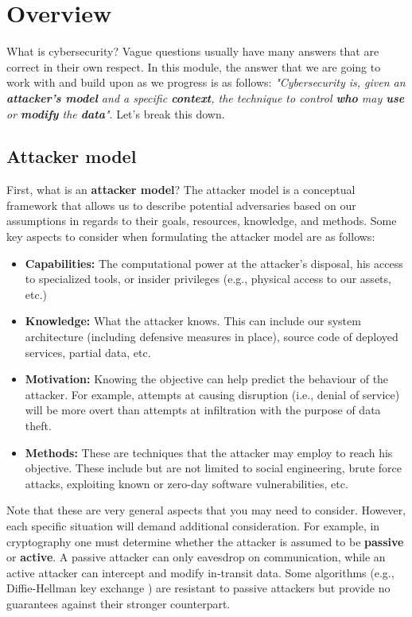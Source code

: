 \section{Overview}

What is cybersecurity? Vague questions usually have many answers that are
correct in their own respect. In this module, the answer that we are going to
work with and build upon as we progress is as follows: \textit{"Cybersecurity
is, given an \textbf{attacker's model} and a specific \textbf{context}, the
technique to control \textbf{who} may \textbf{use} or \textbf{modify} the
\textbf{data}"}. Let's break this down.

\subsection{Attacker model}

First, what is an \textbf{attacker model}? The attacker model is a conceptual
framework that allows us to describe potential adversaries based on our
assumptions in regards to their goals, resources, knowledge, and methods. Some
key aspects to consider when formulating the attacker model are as follows:

\begin{itemize}
    \item \textbf{Capabilities:} The computational power at the attacker's
          disposal, his access to specialized tools, or insider privileges
          (e.g., physical access to our assets, etc.)
    \item \textbf{Knowledge:} What the attacker knows. This can include our
          system architecture (including defensive measures in place), source
          code of deployed services, partial data, etc.
    \item \textbf{Motivation:} Knowing the objective can help predict the
          behaviour of the attacker. For example, attempts at causing disruption
          (i.e., denial of service) will be more overt than attempts at
          infiltration with the purpose of data theft.
    \item \textbf{Methods:} These are techniques that the attacker may employ to
          reach his objective. These include but are not limited to social
          engineering, brute force attacks, exploiting known or zero-day
          software vulnerabilities, etc.
\end{itemize}

Note that these are very general aspects that you may need to consider. However,
each specific situation will demand additional consideration. For example, in
cryptography one must determine whether the attacker is assumed to be
\textbf{passive} or \textbf{active}. A passive attacker can only eavesdrop on
communication, while an active attacker can intercept and modify in-transit
data. Some algorithms (e.g., Diffie-Hellman key exchange
\cite{mitra2021prevention}) are resistant to passive attackers but provide no
guarantees against their stronger counterpart.

